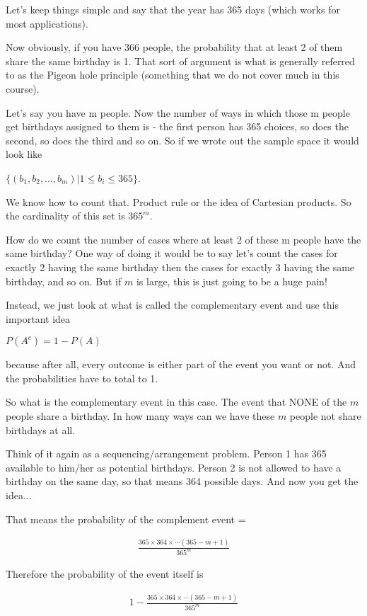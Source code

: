 \documentclass[12pt]{article}
\begin{document}
Let's keep things simple and say that the year has 365 days (which works for most applications). 

Now obviously, if you have 366 people, the probability that at least 2 of them share the same birthday is 1. That sort of argument is what is generally referred to as the Pigeon hole principle (something that we do not cover much in this course).

Let's say you have m people. Now the number of ways in which those m people get birthdays assigned to them is - the first person has 365 choices, so does the second, so does the third and so on. So if we wrote out the sample space it would look like

$\{(b_1, b_2, \ldots, b_m)| 1 \le b_i \le 365 \}$.

We know how to count that. Product rule or the idea of Cartesian products. So the cardinality of this set is $365^m$.

How do we count the number of cases where at least 2 of these m people have the same birthday?
One way of doing it would be to say let's count the cases for exactly 2 having the same birthday then the cases for exactly 3 having the same birthday, and so on. But if $m$ is large, this is just going to be a huge pain!

Instead, we just look at what is called the complementary event and use this important idea

$P(A^c) = 1 - P(A)$ 

because after all, every outcome is either part of the event you want or not. And the probabilities have to total to 1.

So what is the complementary event in this case. The event that NONE of the $m$ people share a birthday. In how many ways can we have these $m$ people not share birthdays at all.

Think of it again as a sequencing/arrangement problem. Person 1 has 365 available to him/her as potential birthdays. Person 2 is not allowed to have a birthday on the same day, so that means 364 possible days. And now you get the idea...

That means the probability of the complement event = 

\begin{align*}
\frac{365 \times 364 \times \cdots (365-m+1)}{365^m}
\end{align*}

Therefore the probability of the event itself is

\begin{align*}
1 - \frac{365 \times 364 \times \cdots (365-m+1)}{365^m}
\end{align*}
\end{document}
